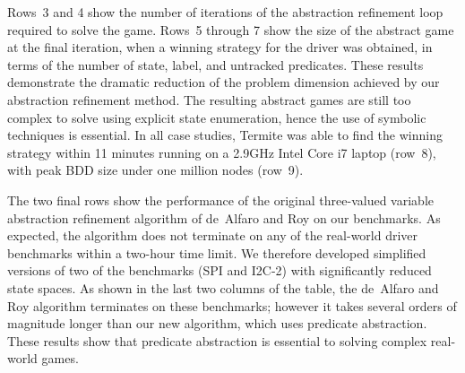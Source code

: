 Rows~3 and 4 show the number of iterations of the abstraction refinement loop required to solve the game.  Rows~5 through 7 show the size of the abstract game at the final iteration, when a winning strategy for the driver was obtained, in terms of the number of state, label, and untracked predicates.  These results demonstrate the dramatic reduction of the problem dimension achieved by our abstraction refinement method.  The resulting abstract games are still too complex to solve using explicit state enumeration, hence the use of symbolic techniques is essential.  In all case studies, Termite was able to find the winning strategy within 11 minutes running on a 2.9GHz Intel Core i7 laptop (row~8), with peak BDD size under one million nodes (row~9).

The two final rows show the performance of the original three-valued variable abstraction refinement algorithm of de~Alfaro and Roy on our benchmarks.  As expected, the algorithm does not terminate on any of the real-world driver benchmarks within a two-hour time limit.  We therefore developed simplified versions of two of the benchmarks (SPI and I2C-2) with significantly reduced state spaces.  As shown in the last two columns of the table, the de~Alfaro and Roy algorithm terminates on these benchmarks; however it takes several orders of magnitude longer than our new algorithm, which uses predicate abstraction.  These results show that predicate abstraction is essential to solving complex real-world games.


